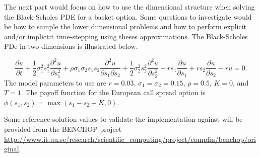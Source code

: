 \documentclass{article}
\begin{document}
The next part would focus on how to use the dimensional structure when solving the Black-Scholes PDE for a basket option. Some questions to investigate would be how to sample the lower dimensional problems and how to perform explicit and/or implictit time-stepping using theses approximations. The Black-Scholes PDe in two dimensions is illustrated below.

\begin{equation}
\frac{\partial u}{\partial t}  +
\frac{1}{2} \sigma_1^2 s_1^2 \frac{\partial^2 u}{\partial s_1^2}
+ \rho \sigma_1 \sigma_2 s_1s_2 \frac{\partial^2 u}{\partial s_1 \partial s_2}
+ \frac{1}{2} \sigma_2^2 s_2^2 \frac{\partial ^2u}{\partial s_2^2}
+ r s_1 \frac{\partial u}{\partial s_1}
+ r s_2 \frac{\partial u}{\partial s_2} 
 - r  u=0.
\end{equation}
The model parameters to use are $r = 0.03$, $\sigma_1 = \sigma_2=0.15$, $\rho = 0.5$, $K=0$, and $T=1$. The payoff function for the European call spread option is $\phi(s_1,s_2)=\max(s_1-s_2-K,0)$.

\cite{von2015benchop}


Some reference solution values to validate the implementation against will be provided from the BENCHOP project \url{http://www.it.uu.se/research/scientific_computing/project/compfin/benchop/original}. 


\end{document}
